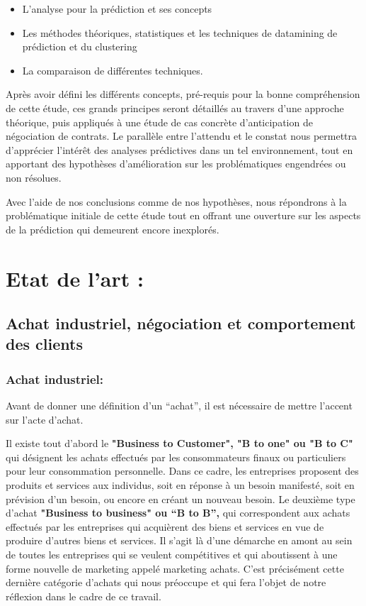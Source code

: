 \documentclass[12pt]{article}
\begin{document}
\begin{itemize}
\item L’analyse pour la prédiction et ses concepts
\item Les méthodes théoriques, statistiques et les techniques de datamining de prédiction et du clustering 
\item La comparaison de différentes techniques.
\end{itemize}

Après avoir défini les différents concepts, pré-requis pour la bonne compréhension de cette étude, ces grands principes seront détaillés au travers d'une approche théorique, puis appliqués à une étude de cas concrète d’anticipation de négociation de contrats. Le parallèle entre l'attendu et le constat nous permettra d’apprécier l’intérêt des analyses prédictives dans un tel environnement, tout en apportant des hypothèses d'amélioration sur les problématiques engendrées ou non résolues.


Avec l’aide de nos conclusions comme de nos hypothèses, nous répondrons à la problématique initiale de cette étude tout en offrant une ouverture sur les aspects de la prédiction qui demeurent encore inexplorés.

\pagebreak

\section{Etat de l’art :}
\subsection{Achat industriel, négociation et comportement des clients}
\subsubsection{Achat industriel:}

Avant de donner une définition d’un “achat”, il est nécessaire de mettre l’accent sur l’acte d’achat.

Il existe tout d’abord le \textbf{"Business to Customer", "B to one" ou "B to C"}  qui désignent les achats effectués par les consommateurs finaux ou particuliers pour leur consommation personnelle. Dans ce cadre, les entreprises proposent des produits et services aux individus, soit en réponse à un besoin manifesté, soit en prévision d'un besoin, ou encore en créant un nouveau besoin.
Le deuxième type d’achat \textbf{"Business to business" ou “B to B”,} qui correspondent aux achats effectués par les entreprises qui acquièrent des biens et services en vue de produire d'autres biens et services. Il s'agit là d'une démarche en amont au sein de toutes les entreprises qui se veulent compétitives et qui aboutissent à une forme nouvelle de marketing appelé marketing achats. 
C'est précisément cette dernière catégorie d'achats qui nous préoccupe et qui fera l'objet de notre réflexion dans le cadre de ce travail.
\end{document}
